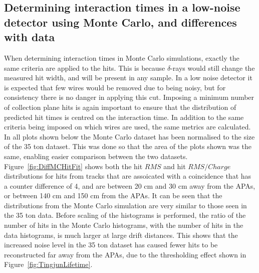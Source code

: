 \subsection{Determining interaction times in a low-noise detector using Monte Carlo, and differences with data} \label{sec:MCDataComp}
When determining interaction times in Monte Carlo simulations, exactly the same criteria are applied to the hits. This is because $\delta$-rays would still change the measured hit width, and will be present in any sample. In a low noise detector it is expected that few wires would be removed due to being noisy, but for consistency there is no danger in applying this cut. Imposing a minimum number of collection plane hits is again important to ensure that the distribution of predicted hit times is centred on the interaction time. In addition to the same criteria being imposed on which wires are used, the same metrics are calculated. In all plots shown below the Monte Carlo dataset has been normalised to the size of the 35 ton dataset. This was done so that the area of the plots shown was the same, enabling easier comparison between the two datasets. \\

Figure~\ref{fig:DiffMCHitFit} shows both the hit $RMS$ and hit $RMS/Charge$ distributions for hits from tracks that are assoicated with a coincidence that has a counter difference of 4, and are between 20 cm and 30 cm away from the APAs, or between 140 cm and 150 cm from the APAs. It can be seen that the distributions from the Monte Carlo simulation are very similar to those seen in the 35 ton data. Before scaling of the histograms is performed, the ratio of the number of hits in the Monte Carlo histograms, with the number of hits in the data histograms, is much larger at large drift distances. This shows that the increased noise level in the 35 ton dataset has caused fewer hits to be reconstructed far away from the APAs, due to the thresholding effect shown in Figure~\ref{fig:TingjunLifetime}. \\

